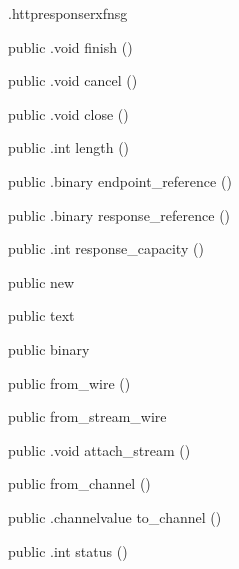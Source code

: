 \begin{CrexxClass}{.httpresponse}{rxfnsg}
\begin{Members}
    \Method
      {public}
      {.void}
      {finish}
      {()}

    \Method
      {public}
      {.void}
      {cancel}
      {()}

    \Method
      {public}
      {.void}
      {close}
      {()}

    \Method
      {public}
      {.int}
      {length}
      {()}

    \Method
      {public}
      {.binary}
      {endpoint\_reference}
      {()}

    \Method
      {public}
      {.binary}
      {response\_reference}
      {()}

    \Method
      {public}
      {.int}
      {response\_capacity}
      {()}

    \Factory
      {public}
      {new}
      {}

    \Factory
      {public}
      {text}
      {}

    \Factory
      {public}
      {binary}
      {}

    \Factory
      {public}
      {from\_wire}
      {()}

    \Factory
      {public}
      {from\_stream\_wire}
      {}

    \Method
      {public}
      {.void}
      {attach\_stream}
      {()}

    \Factory
      {public}
      {from\_channel}
      {()}

    \Method
      {public}
      {.channelvalue}
      {to\_channel}
      {()}

    \Method
      {public}
      {.int}
      {status}
      {()}


\end{Members}
\end{CrexxClass}
